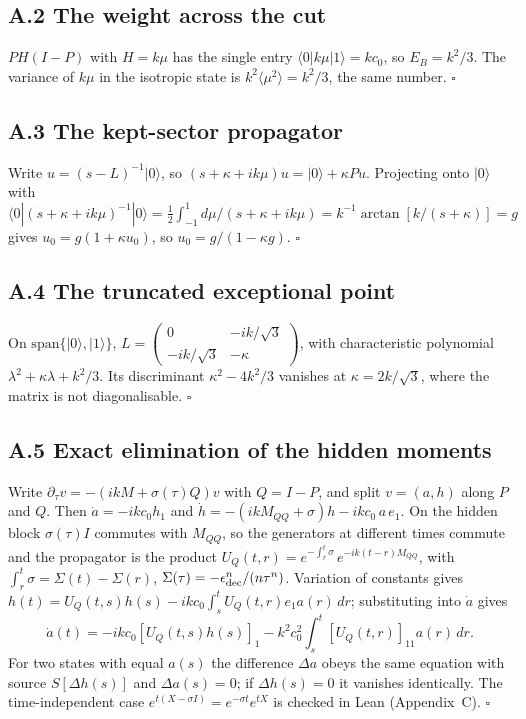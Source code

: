 \documentclass[11pt]{article}
\begin{document}
\subsection*{A.2 The weight across the cut}
$PH(I-P)$ with $H=k\mu$ has the single entry $\langle0|k\mu|1\rangle=kc_0$, so $E_B=k^2/3$. The variance of $k\mu$ in the isotropic state is $k^2\langle\mu^2\rangle=k^2/3$, the same number. $\square$
\subsection*{A.3 The kept-sector propagator}
Write $u=(s-L)^{-1}|0\rangle$, so $(s+\kappa+ik\mu)u=|0\rangle+\kappa Pu$. Projecting onto $|0\rangle$ with $\langle0|(s+\kappa+ik\mu)^{-1}|0\rangle=\tfrac12\int_{-1}^{1}d\mu/(s+\kappa+ik\mu)=k^{-1}\arctan[k/(s+\kappa)]=g$ gives $u_0=g(1+\kappa u_0)$, so $u_0=g/(1-\kappa g)$. $\square$
\subsection*{A.4 The truncated exceptional point}
On $\mathrm{span}\{|0\rangle,|1\rangle\}$, $L=\begin{pmatrix}0&-ik/\sqrt3\\-ik/\sqrt3&-\kappa\end{pmatrix}$, with characteristic polynomial $\lambda^2+\kappa\lambda+k^2/3$. Its discriminant $\kappa^2-4k^2/3$ vanishes at $\kappa=2k/\sqrt3$, where the matrix is not diagonalisable. $\square$

\subsection*{A.5 Exact elimination of the hidden moments}
Write $\partial_\tau v=-(ikM+\sigma(\tau)Q)v$ with $Q=I-P$, and split $v=(a,h)$ along $P$ and $Q$. Then $\dot a=-ikc_0h_1$ and $\dot h=-(ikM_{QQ}+\sigma)h-ikc_0\,a\,e_1$. On the hidden block $\sigma(\tau)I$ commutes with $M_{QQ}$, so the generators at different times commute and the propagator is the product $U_Q(t,r)=e^{-\int_r^t\sigma}\,e^{-ik(t-r)M_{QQ}}$, with $\int_r^t\sigma=\Sigma(t)-\Sigma(r)$, $\Sigma(\tau)=-\epsilon_{\rm dec}^n/(n\tau^n)$. Variation of constants gives $h(t)=U_Q(t,s)h(s)-ikc_0\int_s^tU_Q(t,r)e_1a(r)\,dr$; substituting into $\dot a$ gives
\[
\dot a(t)=-ikc_0[U_Q(t,s)h(s)]_1-k^2c_0^2\int_s^t[U_Q(t,r)]_{11}a(r)\,dr .
\]
For two states with equal $a(s)$ the difference $\Delta a$ obeys the same equation with source $S[\Delta h(s)]$ and $\Delta a(s)=0$; if $\Delta h(s)=0$ it vanishes identically. The time-independent case $e^{t(X-\sigma I)}=e^{-\sigma t}e^{tX}$ is checked in Lean (Appendix~C). $\square$
\end{document}
